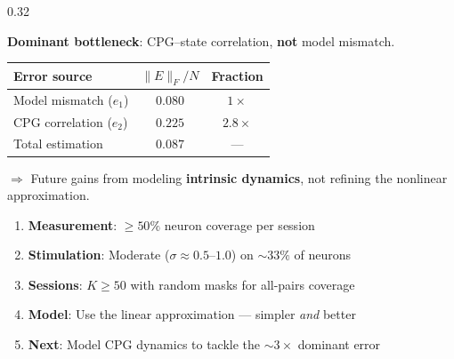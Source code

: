 \documentclass[final]{beamer}
\begin{document}
\begin{frame}[t]
\begin{columns}[T]
\begin{column}{0.32\linewidth}
\vspace{1cm}

\begin{tcolorbox}[posterbox,title=Error Decomposition]
\large
\textbf{Dominant bottleneck}: CPG--state correlation, \textbf{not} model mismatch.

\vspace{4mm}
\begin{center}
\renewcommand{\arraystretch}{1.5}
\begin{tabular}{lcc}
  \toprule
  \textbf{Error source} & $\|E\|_F / N$ & \textbf{Fraction} \\
  \midrule
  Model mismatch ($e_1$) & $0.080$ & $1\times$ \\
  \rowcolor{neuripsred!15} CPG correlation ($e_2$) & $0.225$ & $2.8\times$ \\
  Total estimation & $0.087$ & --- \\
  \bottomrule
\end{tabular}
\end{center}

\vspace{4mm}
$\Rightarrow$ Future gains from modeling \textbf{intrinsic dynamics}, not refining the nonlinear approximation.
\end{tcolorbox}

\vspace{1cm}

\begin{tcolorbox}[posterbox,title=Practical Guidelines for Experimentalists,colframe=neuripsgreen,colbacktitle=neuripsgreen]
\large
\begin{enumerate}
  \item[\color{neuripsgreen}\textbf{1.}] \textbf{Measurement}: $\geq 50\%$ neuron coverage per session
  \item[\color{neuripsgreen}\textbf{2.}] \textbf{Stimulation}: Moderate ($\sigma \approx 0.5$--$1.0$) on $\sim 33\%$ of neurons
  \item[\color{neuripsgreen}\textbf{3.}] \textbf{Sessions}: $K \geq 50$ with random masks for all-pairs coverage
  \item[\color{neuripsgreen}\textbf{4.}] \textbf{Model}: Use the linear approximation --- simpler \emph{and} better
  \item[\color{neuripsgreen}\textbf{5.}] \textbf{Next}: Model CPG dynamics to tackle the ${\sim}3\times$ dominant error
\end{enumerate}
\end{tcolorbox}

\end{column}

\end{columns}

\end{frame}
\end{document}
